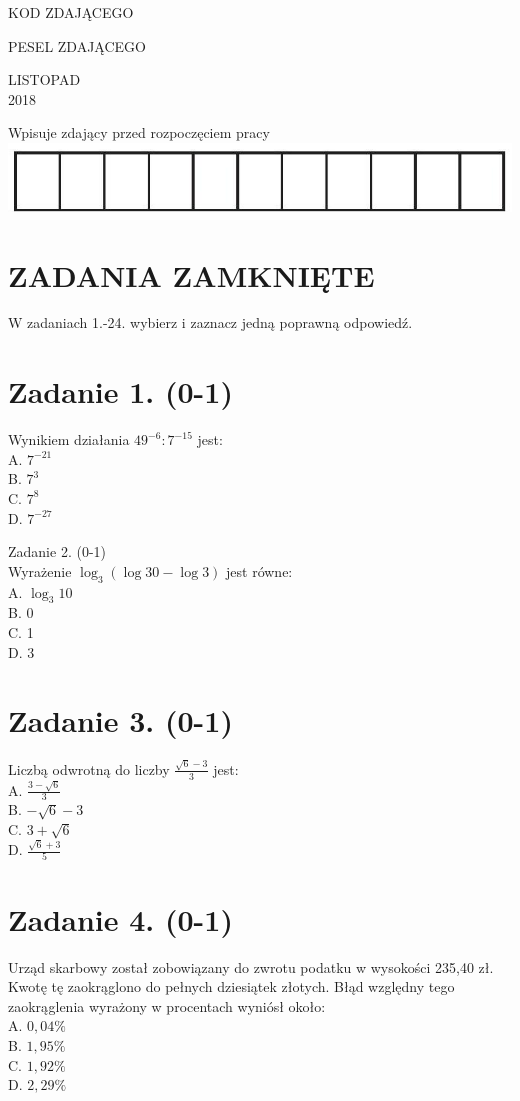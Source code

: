 \documentclass[10pt]{article}
\begin{document}
KOD ZDAJĄCEGO

PESEL ZDAJĄCEGO

LISTOPAD\\
2018

Wpisuje zdający przed rozpoczęciem pracy\\
\includegraphics[max width=\textwidth, center]{2024_11_21_724abc2cf5a71562f5b2g-01}

\section*{ZADANIA ZAMKNIĘTE}
W zadaniach 1.-24. wybierz i zaznacz jedną poprawną odpowiedź.

\section*{Zadanie 1. (0-1)}
Wynikiem działania \(49^{-6}: 7^{-15}\) jest:\\
A. \(7^{-21}\)\\
B. \(7^{3}\)\\
C. \(7^{8}\)\\
D. \(7^{-27}\)

Zadanie 2. (0-1)\\
Wyrażenie \(\log _{3}(\log 30-\log 3)\) jest równe:\\
A. \(\log _{3} 10\)\\
B. 0\\
C. 1\\
D. 3

\section*{Zadanie 3. (0-1)}
Liczbą odwrotną do liczby \(\frac{\sqrt{6}-3}{3}\) jest:\\
A. \(\frac{3-\sqrt{6}}{3}\)\\
B. \(-\sqrt{6}-3\)\\
C. \(3+\sqrt{6}\)\\
D. \(\frac{\sqrt{6}+3}{5}\)

\section*{Zadanie 4. (0-1)}
Urząd skarbowy został zobowiązany do zwrotu podatku w wysokości 235,40 zł. Kwotę tę zaokrąglono do pełnych dziesiątek złotych. Błąd względny tego zaokrąglenia wyrażony w procentach wyniósł około:\\
A. \(0,04 \%\)\\
B. \(1,95 \%\)\\
C. \(1,92 \%\)\\
D. \(2,29 \%\)
\end{document}
